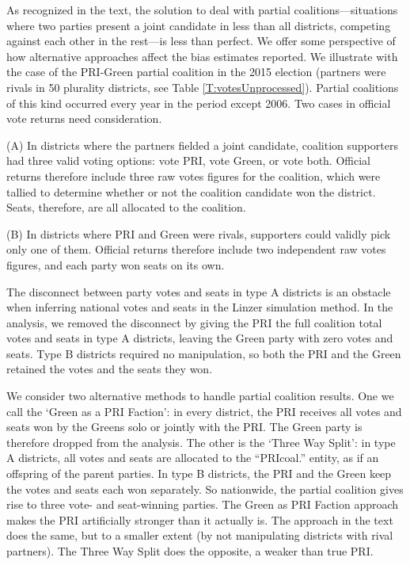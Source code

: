 \documentclass[letter,12pt]{article}
\begin{document}
As recognized in the text, the solution to deal with partial coalitions---situations where two parties present a joint candidate in less than all districts, competing against each other in the rest---is less than perfect. We offer some perspective of how alternative approaches affect the bias estimates reported. We illustrate with the case of the PRI-Green partial coalition in the 2015 election (partners were rivals in 50 plurality districts, see Table \ref{T:votesUnprocessed}). Partial coalitions of this kind occurred every year in the period except 2006. Two cases in official vote returns need consideration. 

(A) In districts where the partners fielded a joint candidate, coalition supporters had three valid voting options: vote PRI, vote Green, or vote both. Official returns therefore include three raw votes figures for the coalition, which were tallied to determine whether or not the coalition candidate won the district. Seats, therefore, are all allocated to the coalition. 

(B) In districts where PRI and Green were rivals, supporters could validly pick only one of them. Official returns therefore include two independent raw votes figures, and each party won seats on its own. 

The disconnect between party votes and seats in type A districts is an obstacle when inferring national votes and seats in the Linzer simulation method. In the analysis, we removed the disconnect by giving the PRI the full coalition total votes and seats in type A districts, leaving the Green party with zero votes and seats. Type B districts required no manipulation, so both the PRI and the Green retained the votes and the seats they won. 

We consider two alternative methods to handle partial coalition results. One we call the `Green as a PRI Faction': in every district, the PRI receives all votes and seats won by the Greens solo or jointly with the PRI. The Green party is therefore dropped from the analysis. The other is the `Three Way Split': in type A districts, all votes and seats are allocated to the ``PRIcoal.'' entity, as if an offspring of the parent parties. In type B districts, the PRI and the Green keep the votes and seats each won separately. So nationwide, the partial coalition gives rise to three vote- and seat-winning parties. The Green as PRI Faction approach makes the PRI artificially stronger than it actually is. The approach in the text does the same, but to a smaller extent (by not manipulating districts with rival partners). The Three Way Split does the opposite, a weaker than true PRI. 
\end{document}
